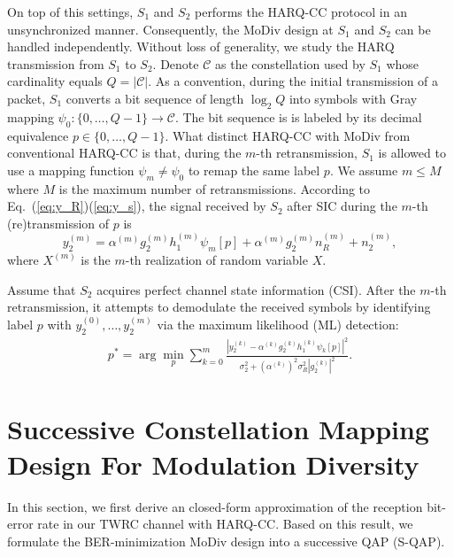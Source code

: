 \documentclass{article}
\begin{document}
On top of this settings, $S_1$ and $S_2$ performs the HARQ-CC protocol
in an unsynchronized manner. Consequently, the MoDiv design at $S_1$ and $S_2$
can be handled independently. Without loss of generality, we study the HARQ
transmission from $S_1$ to $S_2$. Denote $\mathcal{C}$ as the constellation used
by $S_1$ whose cardinality equals $Q=|\mathcal{C}|$. As a convention, during the
initial transmission of a packet, $S_1$ converts a bit sequence of length
$\log_2Q$ into symbols with Gray mapping $\psi_0:\{0,\ldots,Q - 1\}\rightarrow
\mathcal{C}$. The bit sequence is is labeled by its decimal equivalence $p\in
\{0,\ldots,Q - 1\}$. What distinct HARQ-CC with MoDiv from conventional HARQ-CC
is that, during the $m$-th retransmission, $S_1$ is allowed to use a
mapping function $\psi_m\not=\psi_0$ to remap the same label $p$. We assume
$m \leq M$ where $M$ is the maximum number of retransmissions. According to
Eq.~(\ref{eq:y_R})(\ref{eq:y_s}), the signal received by $S_2$ after SIC during
the $m$-th (re)transmission of $p$ is
\begin{equation}
  y_2^{(m)} = \alpha^{(m)} g_2^{(m)}h_1^{(m)}\psi_m[p] +
  \alpha^{(m)} g_2^{(m)}n_R^{(m)} + n_2^{(m)},
\end{equation}
where $X^{(m)}$ is the $m$-th realization of random variable $X$.

Assume that $S_2$ acquires perfect channel state information
(CSI). After the $m$-th retransmission, it attempts to demodulate the received symbols by
identifying label $p$ with $y_2^{(0)},\ldots,y_2^{(m)}$ via the maximum
likelihood (ML) detection:
\begin{align}
  p^* = \arg\min_p\sum_{k=0}^{m} \frac{|y_2^{(k)} -
  \alpha^{(k)} g_2^{(k)} h_1^{(k)}\psi_k[p]|^2}
  {\sigma_2^2+(\alpha^{(k)})^2\sigma_R^2|g_2^{(k)}|^2}.
  \label{eq:ml}
\end{align}

\section{Successive Constellation Mapping Design For Modulation Diversity}
\label{sec:modiv}
In this section, we first derive an closed-form approximation of
the reception bit-error rate in our TWRC channel with HARQ-CC. Based on this
result, we formulate the BER-minimization MoDiv design into a successive
QAP (S-QAP).
\end{document}
